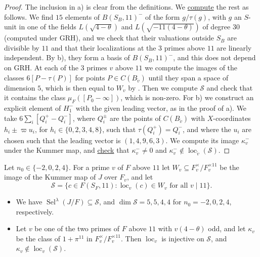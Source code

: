 \documentclass[11pt,reqno]{amsart}
\DeclareMathOperator{\Sel}{Sel}
\DeclareMathOperator{\loc}{loc}
\newcommand{\repocommit}{c12c8c3705ed0b6b52254df69bd5ffe84542d568}
\newcommand{\gitlink}[2]{\href{https://github.com/F-Najman/Xns-121-/blob/\repocommit/#1}{#2}}
\theoremstyle{definition}
\numberwithin{equation}{section}
\begin{document}
\begin{proof}
The inclusion in a) is clear from the definitions. We \gitlink{code/odd_selmer.m}{compute} the rest as follows. We find $15$ elements of $B(S_B,11)^-$ of the form $g/\tau(g)$, with $g$ an $S$-unit in one of the fields $L(\sqrt{4-\theta})$ and $L(\sqrt{-11(4-\theta)})$ of degree $30$ (computed under GRH), and we check that their valuations outside $S_B$ are divisible by $11$ and that their localizations at the $3$ primes above $11$ are linearly independent. By  b), they form a basis of $B(S_B,11)^-$, and this does not depend on GRH. At each of the $3$ primes $v$ above $11$ we compute the images of the classes $6[P-\tau(P)]$ for points $P\in C(B_{\tilde v})$ until they span a space of dimension $5$, which is then equal to $W_v$ by . Then we compute $\mathcal S$ and check that it contains the class $\mu_F([P_0-\infty])$, which is non-zero. For b) we construct an explicit element of $H_1^-$ with the given leading vector, as in the proof of  a). We take $6\sum_i[Q_i^+-Q_i^-]$, where $Q_i^{\pm}$ are the points of $C(B_{\tilde v})$ with $X$-coordinates $h_i\pm\varpi u_i$, for $h_i\in\{0,2,3,4,8\}$, such that $\tau(Q_i^+)=Q_i^-$, and where the $u_i$ are chosen such that the leading vector is $(1,4,9,6,3)$. We compute its image $\kappa_v^-$ under the Kummer map, and \gitlink{code/single_place.m}{check} that $\kappa_v^-\neq 0$ and $\kappa_v^-\notin \loc_{\tilde v}(\mathcal S)$.
\end{proof}

\begin{proposition}\label{prop:even_selmer}
Let $n_0\in\{-2,0,2,4\}$. For a prime $v$ of $F$ above $11$ let $W_v\subseteq F_v^\times/F_v^{\times 11}$ be the image of the Kummer map of $J$ over $F_v$, and let
$$\mathcal S=\{c\in F(S_F,11): \loc_v(c)\in W_v \text{ for all } v\mid 11\}.$$
\begin{itemize}
\item[a)] We have $\Sel^\lambda(J/F)\subseteq\mathcal S$, and $\dim\mathcal S=5,5,4,4$ for $n_0=-2,0,2,4$, respectively.
\item[b)] Let $v$ be one of the two primes of $F$ above $11$ with $v(4-\theta)$ odd, and let $\kappa_v$ be the class of $1+\pi^{11}$ in $F_v^\times/F_v^{\times 11}$. Then $\loc_v$ is injective on $\mathcal S$, and $\kappa_v\notin\loc_v(\mathcal S)$.
\end{itemize}
\end{proposition}
\end{document}
